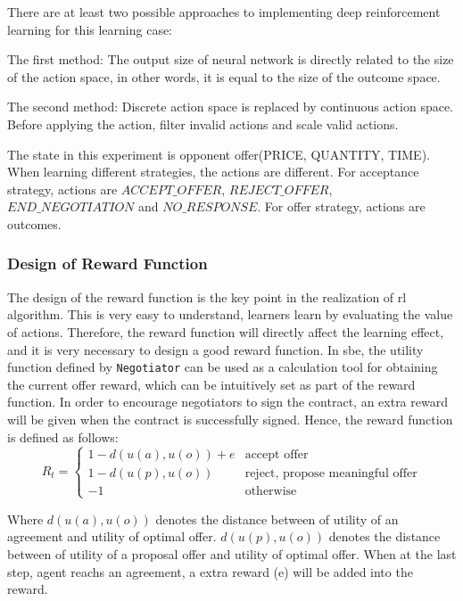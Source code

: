 There are at least two possible approaches to implementing deep reinforcement learning for this learning case:

The first method: The output size of neural network is directly related to the size of the action space, in other words, it is equal to the size of the outcome space. 

The second method: Discrete action space is replaced by continuous action space. Before applying the action, filter invalid actions and scale valid actions.

The state in this experiment is opponent offer(PRICE, QUANTITY, TIME). When learning different strategies, the actions are different. For acceptance strategy, actions are $ACCEPT\_OFFER$, $REJECT\_OFFER$, $END\_NEGOTIATION$ and $NO\_RESPONSE$. For offer strategy, actions are outcomes.

\subsubsection{Design of Reward Function}
The design of the reward function is the key point in the realization of \gls{rl} algorithm. This is very easy to understand, learners learn by evaluating the value of actions. Therefore, the reward function will directly affect the learning effect, and it is very necessary to design a good reward function. In \gls{sbe}, the utility function defined by \texttt{Negotiator} can be used as a calculation tool for obtaining the current offer reward, which can be intuitively set as part of the reward function. In order to encourage negotiators to sign the contract, an extra reward will be given when the contract is successfully signed. Hence, the reward function is defined as follows:
\begin{equation}
R_{t}=\left\{\begin{array}{ll}
1 - d(u(a), u(o)) + e & \text {accept offer}\\
1 - d(u(p), u(o))  & \text {reject, propose meaningful offer} \\
-1 & \text{otherwise}
\end{array}\right.
\end{equation}

Where $d(u(a), u(o))$ denotes the distance between of utility of an agreement and utility of optimal offer.  $d(u(p), u(o))$ denotes the distance between of utility of a proposal offer and utility of optimal offer. When at the last step, agent reachs an agreement, a extra reward (e) will be added into the reward.

